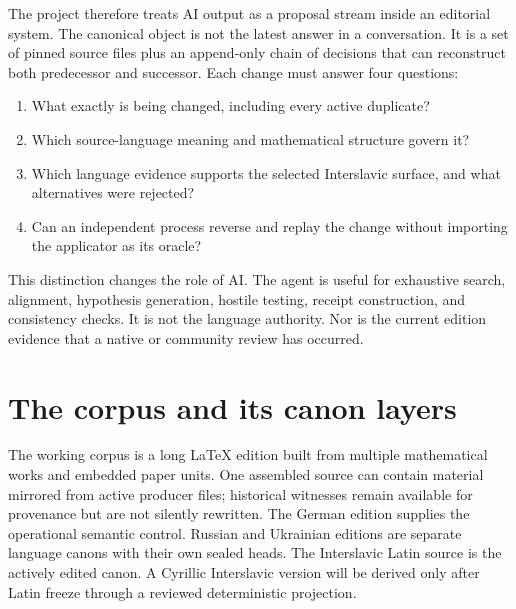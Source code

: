 \documentclass[11pt,a4paper]{article}
\begin{document}
The project therefore treats AI output as a proposal stream inside an editorial system. The canonical object is not the latest answer in a conversation. It is a set of pinned source files plus an append-only chain of decisions that can reconstruct both predecessor and successor. Each change must answer four questions:

\begin{enumerate}
  \item What exactly is being changed, including every active duplicate?
  \item Which source-language meaning and mathematical structure govern it?
  \item Which language evidence supports the selected Interslavic surface, and what alternatives were rejected?
  \item Can an independent process reverse and replay the change without importing the applicator as its oracle?
\end{enumerate}

This distinction changes the role of AI. The agent is useful for exhaustive search, alignment, hypothesis generation, hostile testing, receipt construction, and consistency checks. It is not the language authority. Nor is the current edition evidence that a native or community review has occurred.

\section{The corpus and its canon layers}

The working corpus is a long \LaTeX{} edition built from multiple mathematical works and embedded paper units. One assembled source can contain material mirrored from active producer files; historical witnesses remain available for provenance but are not silently rewritten. The German edition supplies the operational semantic control. Russian and Ukrainian editions are separate language canons with their own sealed heads. The Interslavic Latin source is the actively edited canon. A Cyrillic Interslavic version will be derived only after Latin freeze through a reviewed deterministic projection.
\end{document}
